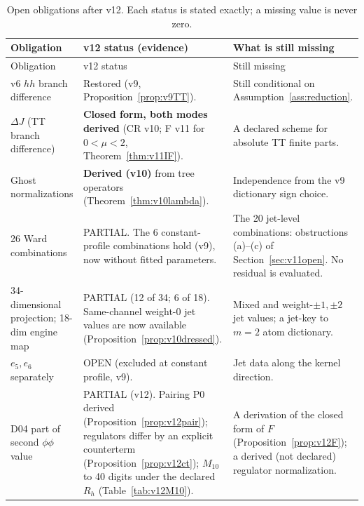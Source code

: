 \documentclass[11pt,a4paper]{article}
\newcommand{\OPEN}{\textsf{OPEN}}
\newcommand{\PARTIAL}{\textsf{PARTIAL}}
\theoremstyle{plain}
\theoremstyle{definition}
\theoremstyle{remark}
\numberwithin{equation}{section}
\begin{document}
\begingroup\small
\begin{longtable}{@{}L{.22\linewidth}L{.40\linewidth}L{.31\linewidth}@{}}
\caption{Open obligations after v12. Each status is stated
exactly; a missing value is never zero.}
\label{tab:open}\\
\toprule
Obligation & v12 status (evidence) & What is still missing\\
\midrule
\endfirsthead
\toprule
Obligation & v12 status & Still missing\\
\midrule
\endhead
\bottomrule
\endfoot

v6 \(hh\) branch difference &
Restored (v9, Proposition~\ref{prop:v9TT}). &
Still conditional on Assumption~\ref{ass:reduction}.\\

\(\Delta J\) (TT branch difference) &
\textbf{Closed form, both modes derived} (CR v10; F v11 for
\(0<\mu<2\), Theorem~\ref{thm:v11IF}). &
A declared scheme for absolute TT finite parts.\\

Ghost normalizations &
\textbf{Derived (v10)} from tree operators
(Theorem~\ref{thm:v10lambda}). &
Independence from the v9 dictionary sign choice.\\

26 Ward combinations &
\PARTIAL. The 6 constant-profile combinations hold (v9), now
without fitted parameters. &
The 20 jet-level combinations: obstructions (a)--(c) of
Section~\ref{sec:v11open}. No residual is evaluated.\\

34-dimensional projection; 18-dim engine map &
\PARTIAL{} (12 of 34; 6 of 18). Same-channel weight-0 jet values are
now available (Proposition~\ref{prop:v10dressed}). &
Mixed and weight-\(\pm1,\pm2\) jet values; a jet-key to \(m=2\)
atom dictionary.\\

\(e_5,e_6\) separately &
\OPEN{} (excluded at constant profile, v9). &
Jet data along the kernel direction.\\

D04 part of second \(\phi\phi\) value &
\PARTIAL{} (v12). Pairing P0 derived (Proposition~\ref{prop:v12pair});
regulators differ by an explicit counterterm (Proposition~\ref{prop:v12ct});
\(M_{10}\) to 40 digits under the declared \(R_h\) (Table~\ref{tab:v12M10}). &
A derivation of the closed form of \(F\) (Proposition~\ref{prop:v12F}); a
derived (not declared) regulator normalization.\\


\end{longtable}
\end{document}
